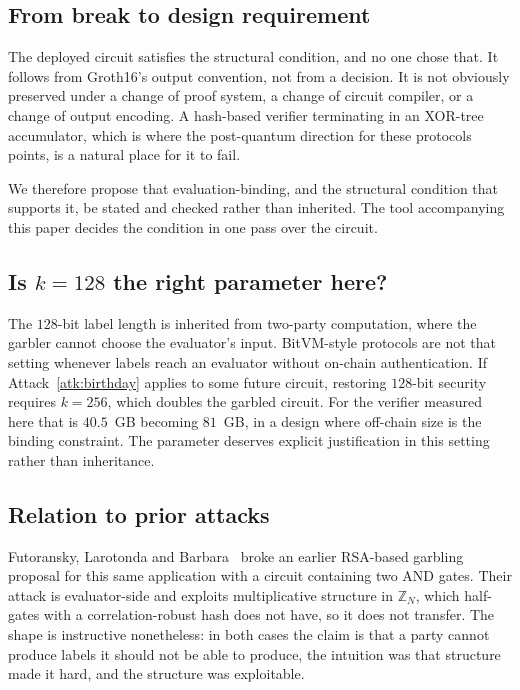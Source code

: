\documentclass[11pt,a4paper]{article}
\theoremstyle{definition}
\theoremstyle{plain}
\begin{document}
\subsection{From break to design requirement}

The deployed circuit satisfies the structural condition, and no one chose that.
It follows from Groth16's output convention, not from a decision. It is not
obviously preserved under a change of proof system, a change of circuit
compiler, or a change of output encoding. A hash-based verifier terminating in
an XOR-tree accumulator, which is where the post-quantum direction for these
protocols points, is a natural place for it to fail.

We therefore propose that evaluation-binding, and the structural condition that
supports it, be stated and checked rather than inherited. The tool accompanying
this paper decides the condition in one pass over the circuit.

\subsection{Is $k = 128$ the right parameter here?}

The $128$-bit label length is inherited from two-party computation, where the
garbler cannot choose the evaluator's input. BitVM-style protocols are not that
setting whenever labels reach an evaluator without on-chain authentication. If
Attack~\ref{atk:birthday} applies to some future circuit, restoring $128$-bit
security requires $k = 256$, which doubles the garbled circuit. For the
verifier measured here that is $40.5$~GB becoming $81$~GB, in a design where
off-chain size is the binding constraint. The parameter deserves explicit
justification in this setting rather than inheritance.

\subsection{Relation to prior attacks}

Futoransky, Larotonda and Barbara~\cite{FairgateNote} broke an earlier
RSA-based garbling proposal for this same application with a circuit containing
two AND gates. Their attack is evaluator-side and exploits multiplicative
structure in $\mathbb{Z}_N$, which half-gates with a correlation-robust hash
does not have, so it does not transfer. The shape is instructive nonetheless:
in both cases the claim is that a party cannot produce labels it should not be
able to produce, the intuition was that structure made it hard, and the
structure was exploitable.
\end{document}
